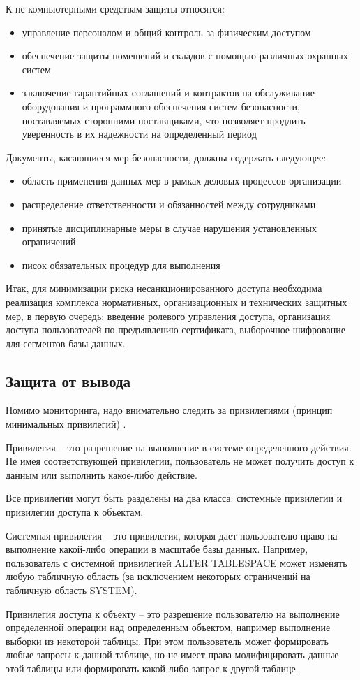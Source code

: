 К не компьютерными средствам защиты относятся:
\begin{itemize}
	\item управление персоналом и общий контроль за физическим доступом
	\item обеспечение защиты помещений и складов с помощью различных охранных систем
	\item заключение гарантийных соглашений и контрактов на обслуживание оборудования и программного обеспечения систем безопасности, поставляемых сторонними поставщиками, что позволяет продлить уверенность в их надежности на определенный период
\end{itemize}

Документы, касающиеся мер безопасности, должны содержать следующее:
\begin{itemize}
	\item область применения данных мер в рамках деловых процессов организации
	\item распределение ответственности и обязанностей между сотрудниками
	\item принятые дисциплинарные меры в случае нарушения установленных ограничений
	\item писок обязательных процедур для выполнения
\end{itemize}

Итак, для минимизации риска несанкционированного доступа необходима реализация комплекса нормативных, организационных и технических защитных мер, в первую очередь: введение ролевого управления доступа, организация доступа пользователей по предъявлению сертификата, выборочное шифрование для сегментов базы данных.

\subsection{Защита от вывода}
Помимо мониторинга, надо внимательно следить за привилегиями (принцип минимальных привилегий) \autocite{Smirnov2007}.
\begin{grayquote}
	Привилегия -- это разрешение на выполнение в системе определенного действия. Не имея соответствующей привилегии, пользователь не может получить доступ к данным или выполнить какое-либо действие.
\end{grayquote}

Все привилегии могут быть разделены на два класса: системные привилегии и привилегии доступа к объектам.

\begin{grayquote}
	Системная привилегия -- это привилегия, которая дает пользователю право на выполнение какой-либо операции в масштабе базы данных. Например, пользователь с системной привилегией ALTER TABLESPACE может изменять любую табличную область (за исключением некоторых ограничений на табличную область SYSTEM).

	Привилегия доступа к объекту -- это разрешение пользователю на выполнение определенной операции над определенным объектом, например выполнение выборки из некоторой таблицы.
	При этом пользователь может формировать любые запросы к данной таблице, но не имеет права модифицировать данные этой таблицы или формировать какой-либо запрос к другой таблице.
\end{grayquote}

